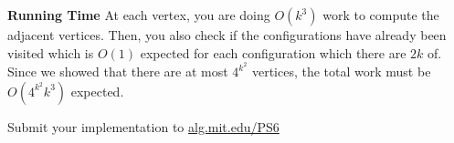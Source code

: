 \documentclass[12pt,twoside]{article}
\begin{document}
\begin{problems}
\begin{problemparts}
    {\bf Running Time} At each vertex, you are doing $O(k^3)$ work to compute
    the adjacent vertices. Then, you also check if the configurations have
    already been visited which is $O(1)$ expected for each configuration
    which there are $2k$ of. Since we showed that there are at most $4^{k^2}$
    vertices, the total work must be $O(4^{k^2} k^3)$ expected.

\problempart Submit your implementation to {\small\url{alg.mit.edu/PS6}}
\end{problemparts}

\end{problems}
\end{document}
